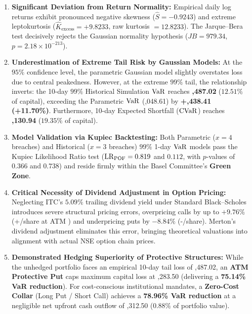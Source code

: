\begin{enumerate}
    \item \textbf{Significant Deviation from Return Normality:} Empirical daily log returns exhibit pronounced negative skewness ($\hat{S} = -0.9243$) and extreme leptokurtosis ($\hat{K}_{\text{excess}} = +9.8233$, raw kurtosis $= 12.8233$). The Jarque--Bera test decisively rejects the Gaussian normality hypothesis ($JB = 979.34$, $p = 2.18 \times 10^{-213}$).
    \item \textbf{Underestimation of Extreme Tail Risk by Gaussian Models:} At the $95\%$ confidence level, the parametric Gaussian model slightly overstates loss due to central peakedness. However, at the extreme $99\%$ tail, the relationship inverts: the 10-day $99\%$ Historical Simulation $\operatorname{VaR}$ reaches \textbf{,487.02} ($12.51\%$ of capital), exceeding the Parametric $\operatorname{VaR}$ (,048.61) by \textbf{+,438.41 (+11.70\%)}. Furthermore, 10-day Expected Shortfall ($\operatorname{CVaR}$) reaches \textbf{,130.94} ($19.35\%$ of capital).
    \item \textbf{Model Validation via Kupiec Backtesting:} Both Parametric ($x = 4$ breaches) and Historical ($x = 3$ breaches) $99\%$ 1-day $\operatorname{VaR}$ models pass the Kupiec Likelihood Ratio test ($\operatorname{LR}_{\operatorname{POF}} = 0.819$ and $0.112$, with $p$-values of $0.366$ and $0.738$) and reside firmly within the Basel Committee's \textbf{Green Zone}.
    \item \textbf{Critical Necessity of Dividend Adjustment in Option Pricing:} Neglecting ITC's $5.09\%$ trailing dividend yield under Standard Black--Scholes introduces severe structural pricing errors, overpricing calls by up to $+9.76\%$ (+/share at ATM ) and underpricing puts by $-8.84\%$ (-/share). Merton's dividend adjustment eliminates this error, bringing theoretical valuations into alignment with actual NSE option chain prices.
    \item \textbf{Demonstrated Hedging Superiority of Protective Structures:} While the unhedged portfolio faces an empirical 10-day tail loss of ,487.02, an \textbf{ATM Protective Put} caps maximum capital loss at ,283.50 (delivering a \textbf{75.14\% VaR reduction}). For cost-conscious institutional mandates, a \textbf{Zero-Cost Collar} (Long  Put / Short  Call) achieves a \textbf{78.96\% VaR reduction} at a negligible net upfront cash outflow of ,312.50 ($0.88\%$ of portfolio value).
\end{enumerate}

